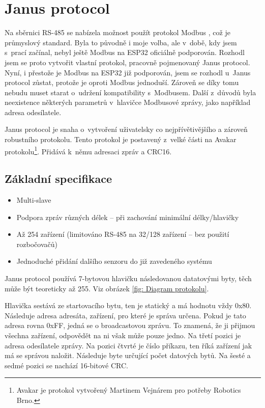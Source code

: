 \chapter{Janus protocol}
Na sběrnici RS-485 se nabízela možnost použít protokol Modbus \cite{modbus}, což je průmyslový standard.
Byla to původně i moje volba, ale v~době, kdy jsem s~prací začínal, nebyl ještě Modbus na ESP32 oficiálně podporován.
Rozhodl jsem se proto vytvořit vlastní protokol, pracovně pojmenovaný Janus protocol.
Nyní, i přestože je Modbus na ESP32 již podporován, jsem se rozhodl u~Janus protocol zůstat, protože je oproti Modbus jednoduší.
Zároveň se díky tomu nebudu muset starat o~udržení kompatibility s~Modbusem.
Další z~důvodů byla neexistence některých parametrů v~hlavičce Modbusové zprávy, jako například adresa odesílatele. 

Janus protocol je snaha o~vytvoření uživatelsky co nejpřívětivějšího a zároveň robustního protokolu.
Tento protokol je postavený z~velké části na Avakar protokolu\footnote{Avakar je protokol vytvořený Martinem Vejnárem pro potřeby Robotics Brno.}.
Přidává k~němu adresaci zpráv a CRC16.


\section{Základní specifikace}
\begin{itemize}
    \item Multi-slave
    \item Podpora zpráv různých délek -- při zachování minimální délky/hlavičky
    \item Až 254 zařízení (limitováno RS-485 na 32/128 zařízení -- bez použití rozbočovačů)
    \item Jednoduché přidání dalšího senzoru do již zavedeného systému
\end{itemize}

Janus protocol používá 7-bytovou hlavičku následovanou datatovými byty, těch může být teoreticky až 255.
Viz obrázek \ref{fig: Diagram protokolu}.

Hlavička sestává ze startovacího bytu, ten je statický a má hodnotu vždy 0x80.
Následuje adresa adresáta, zařízení, pro které je správa určena.
Pokud je tato adresa rovna 0xFF, jedná se o broadcastovou zprávu. To znamená, že ji přijmou všechna zařízení, odpovědět na ni však může pouze jedno.
Na třetí pozici je adresa odesílatele zprávy.
Na pozici čtvrté je číslo příkazu, ten říká zařízení jak má se správou naložit.
Následuje byte určující počet datových bytů.
Na šesté a sedmé pozici se nachází 16-bitové CRC.


